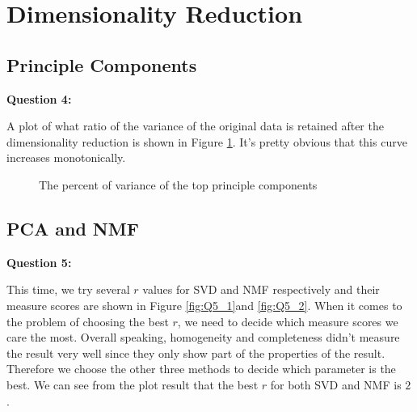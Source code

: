 \documentclass[runningheads]{llncs}
\begin{document}
\section{Dimensionality Reduction}

\subsection{Principle Components}

\textbf{Question 4:}

A plot of what ratio of the variance of the original data is retained after the dimensionality reduction is shown in Figure \ref{fig:Q4}. It's pretty obvious that this curve increases monotonically.

\begin{figure}
\centering
{}
\caption{The percent of variance of the top principle components} \label{fig:Q4}
\end{figure}


\subsection{PCA and NMF}

\textbf{Question 5:}

This time, we try several $r$ values for SVD and NMF respectively and their measure scores are shown in Figure \ref{fig:Q5_1}and \ref{fig:Q5_2}. When it comes to the problem of choosing the best $r$, we need to decide which measure scores we care the most. Overall speaking, homogeneity and completeness didn't measure the result very well since they only show part of the properties of the result. Therefore we choose the other three methods to decide which parameter is the best. We can see from the plot result that the best $r$ for both SVD and NMF is $2$.
\end{document}
